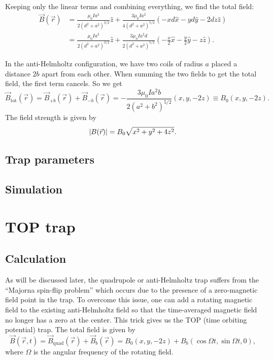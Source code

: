 \documentclass{article}
\theoremstyle{definition}
\newcommand{\f}[2]{\frac{#1}{#2}}
\begin{document}
Keeping only the linear terms and combining everything, we find the total field:
\begin{align*}
\vec{B}(\vec{r}) &= \f{\mu_0 I a^2}{2(d^2 + a^2)^{3/2}} \hat{z} + \f{3\mu_0 Ia^2}{4(d^2+a^2)^{5/2}} \left(- xd\hat{x}  -  y d\hat{y} - 2dz\hat{z}\right)\\
&= \f{\mu_0 I a^2}{2(d^2 + a^2)^{3/2}} \hat{z} + \f{3\mu_0 Ia^2 d}{2(d^2+a^2)^{5/2}} \left(- \f{x}{2}\hat{x}  -  \f{y}{2}\hat{y} - z\hat{z}\right).
\end{align*}






In the anti-Helmholtz configuration, we have two coils of radius $a$ placed a distance $2b$ apart from each other. When summing the two fields to get the total field, the first term cancels. So we get
\begin{equation*}
\vec{B}_\text{tot}(\vec{r}) = \vec{B}_{+b}(\vec{r}) + \vec{B}_{-b}(\vec{r}) = -\f{3\mu_0 I a^2 b}{2(a^2 + b^2)^{5/2}}\left( x,y,-2z \right) \equiv B_0 (x,y,-2z).
\end{equation*}
The field strength is given by 
\begin{equation*}
\abs{B(\vec{r})} = B_0 \sqrt{x^2 + y^2 + 4z^2}.
\end{equation*}



\subsection{Trap parameters}

\subsection{Simulation}




\newpage

\section{TOP trap}


\subsection{Calculation}

As will be discussed later, the quadrupole or anti-Helmholtz trap suffers from the ``Majorna spin-flip problem'' which occurs due to the presence of a zero-magnetic field point in the trap. To overcome this issue, one can add a rotating magnetic field to the existing anti-Helmholtz field so that the time-averaged magnetic field no longer has a zero at the center. This trick gives us the TOP (time orbiting potential) trap. The total field is given by 
\begin{equation*}
\vec{B}(\vec{r},t) = \vec{B}_\text{quad}(\vec{r}) + \vec{B}_b(\vec{r}) = B_0 (x,y,-2z) + B_b(\cos\Omega t, \sin\Omega t,0),
\end{equation*} 
where $\Omega$ is the angular frequency of the rotating field. \\
\end{document}
